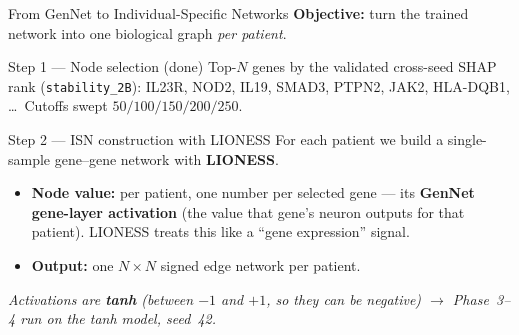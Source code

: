 \documentclass[aspectratio=169]{beamer}
\begin{document}
\begin{frame}{From GenNet to Individual-Specific Networks}
    \small
	\textbf{Objective:} turn the trained network into one biological graph \emph{per patient}.

	\begin{block}{Step 1 --- Node selection (done)}
		\footnotesize
		Top-$N$ genes by the validated cross-seed SHAP rank (\texttt{stability\_2B}):
		IL23R, NOD2, IL19, SMAD3, PTPN2, JAK2, HLA-DQB1, \dots\ Cutoffs swept $50/100/150/200/250$.
	\end{block}

	\begin{block}{Step 2 --- ISN construction with LIONESS}
		\footnotesize
		For each patient we build a single-sample gene--gene network with \textbf{LIONESS}.
		\begin{itemize}
			\item \textbf{Node value:} per patient, one number per selected gene --- its
			      \textbf{GenNet gene-layer activation} (the value that gene's neuron outputs for that
			      patient). LIONESS treats this like a ``gene expression'' signal.
			\item \textbf{Output:} one $N\times N$ signed edge network per patient.
		\end{itemize}
	\end{block}
	\centering\footnotesize
	\textit{Activations are \textbf{tanh} (between $-1$ and $+1$, so they can be negative) $\rightarrow$ Phase~3--4 run on the tanh model, seed~42.}
\end{frame}
\end{document}
